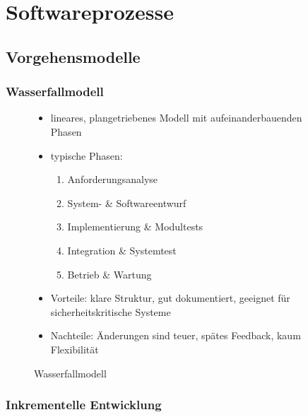 \documentclass[12pt,a4paper,oneside]{article}
\begin{document}
\tableofcontents
\newpage

\section{Softwareprozesse}

\subsection{Vorgehensmodelle}

\subsubsection{Wasserfallmodell}

\begin{figure}[H]

\centering

\begin{minipage}[t]{0.45\textwidth}
\begin{itemize}
\item lineares, plangetriebenes Modell mit aufeinanderbauenden Phasen
\item typische Phasen:
\begin{enumerate}
\item Anforderungsanalyse
\item System- \& Softwareentwurf
\item Implementierung \& Modultests
\item Integration \& Systemtest
\item Betrieb \& Wartung
\end{enumerate}
\item Vorteile: klare Struktur, gut dokumentiert, geeignet für sicherheitskritische Systeme
\item Nachteile: Änderungen sind teuer, spätes Feedback, kaum Flexibilität
\end{itemize}
\end{minipage}
\hfill
\begin{minipage}[t]{0.5\textwidth}
\centering
\vspace{20mm}
\caption{Wasserfallmodell}
\end{minipage}
\end{figure}

\subsubsection{Inkrementelle Entwicklung}
\end{document}
